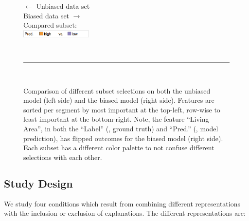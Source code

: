 \begin{figure}[ht!]
{\parbox{0.16\linewidth}{
\centering
\textsf{$\leftarrow$ Unbiased data set}\\
\textsf{Biased data set $\rightarrow$}\\
\textsf{Compared subset:}\\
\includegraphics[height=1em]{aggexplain/legend_pred}
}
}
~\\
\noindent\rule{\linewidth}{0.4pt}
~\\
\caption{
Comparison of different subset selections on both the unbiased model (left side) and the biased model (right side).
Features are sorted per segment by most important at the top-left, row-wise to least important at the bottom-right.
Note, the feature ``Living Area'', in both the ``Label'' (\ie, ground truth) and ``Pred.'' (\ie, model prediction), has flipped outcomes for the biased model (right side).
Each subset has a different color palette to not confuse different selections with each other.
}
\label{figs:good_vs_bad}
\end{figure}

\subsection{Study Design}
We study four conditions which result from combining different representations with the inclusion or exclusion of explanations.
The different representations are:

